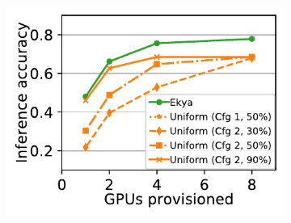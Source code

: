 \begin{figure}
  \centering
  \begin{subfigure}[t]{0.47\linewidth}
    \centering
    \includegraphics[width=\linewidth]{ekya/results/multicam/cityscapes_scheduler_comparison_across_resources.pdf}

\end{subfigure}
\end{figure}
